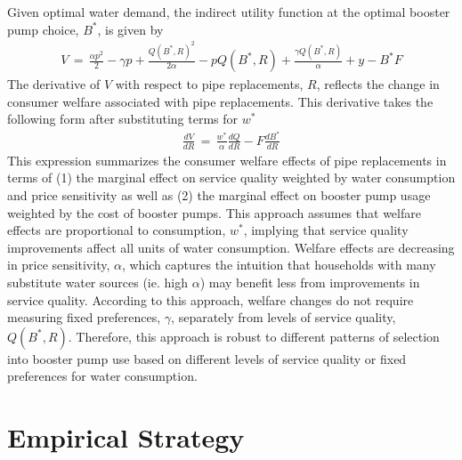 \documentclass[12pt,table]{article}
\begin{document}
Given optimal water demand, the indirect utility function at the optimal booster pump choice, $B^{*}$, is given by 
\begin{align}
V\,=\,\frac{\alpha p^2}{2} - \gamma p + \frac{Q(B^{*},R)^{2}}{2\alpha} - p Q(B^{*},R) + \frac{\gamma Q(B^{*},R)}{\alpha} + y - B^{*} F
\end{align}
The derivative of $V$ with respect to pipe replacements, $R$, reflects the change in consumer welfare associated with pipe replacements.  This derivative takes the following form after substituting terms for $w^{*}$
\begin{align}
\label{eq:dvdr}
\frac{dV}{dR}\,=\,\frac{w^{*}}{\alpha} \frac{dQ}{dR} - F \frac{dB^{*}}{dR}
\end{align}
This expression summarizes the consumer welfare effects of pipe replacements in terms of (1) the marginal effect on service quality weighted by water consumption and price sensitivity as well as (2) the marginal effect on booster pump usage weighted by the cost of booster pumps.  This approach assumes that welfare effects are proportional to consumption, $w^{*}$, implying that service quality improvements affect all units of water consumption.  Welfare effects are decreasing in price sensitivity, $\alpha$, which captures the intuition that households with many substitute water sources (ie. high $\alpha$) may benefit less from improvements in service quality.  According to this approach, welfare changes do not require measuring fixed preferences, $\gamma$, separately from levels of service quality, $Q(B^{*},R)$.  Therefore, this approach is robust to different patterns of selection into booster pump use based on different levels of service quality or fixed preferences for water consumption.  



\section{Empirical Strategy}
\end{document}
